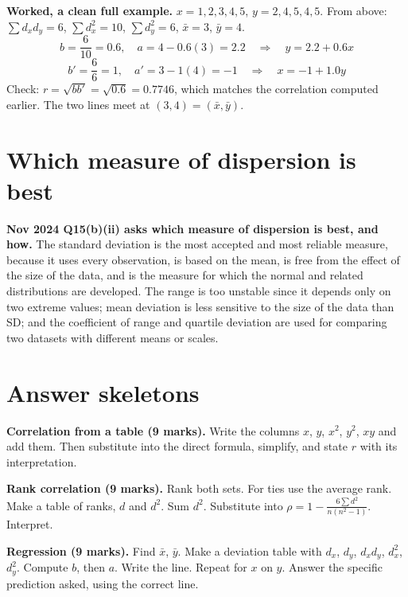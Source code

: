 \documentclass[11pt,a4paper]{article}
\begin{document}
\begin{exambox}
\textbf{Worked, a clean full example.} $x=1,2,3,4,5$, $y=2,4,5,4,5$. From above: $\sum d_xd_y=6$, $\sum d_x^2=10$, $\sum d_y^2=6$, $\bar x=3$, $\bar y=4$.
\[
b=\frac6{10}=0.6,\quad a=4-0.6(3)=2.2 \quad\Rightarrow\quad y=2.2+0.6x
\]
\[
b'=\frac6{6}=1,\quad a'=3-1(4)=-1 \quad\Rightarrow\quad x=-1+1.0y
\]
Check: $r=\sqrt{bb'}=\sqrt{0.6}=0.7746$, which matches the correlation computed earlier. The two lines meet at $(3,4)=(\bar x,\bar y)$.
\end{exambox}

\section{Which measure of dispersion is best}

\begin{exambox}
\textbf{Nov 2024 Q15(b)(ii) asks which measure of dispersion is best, and how.} The standard deviation is the most accepted and most reliable measure, because it uses every observation, is based on the mean, is free from the effect of the size of the data, and is the measure for which the normal and related distributions are developed. The range is too unstable since it depends only on two extreme values; mean deviation is less sensitive to the size of the data than SD; and the coefficient of range and quartile deviation are used for comparing two datasets with different means or scales.
\end{exambox}

\section{Answer skeletons}

\begin{answerbox}
\textbf{Correlation from a table (9 marks).} Write the columns $x$, $y$, $x^2$, $y^2$, $xy$ and add them. Then substitute into the direct formula, simplify, and state $r$ with its interpretation.
\end{answerbox}

\begin{answerbox}
\textbf{Rank correlation (9 marks).} Rank both sets. For ties use the average rank. Make a table of ranks, $d$ and $d^2$. Sum $d^2$. Substitute into $\rho=1-\frac{6\sum d^2}{n(n^2-1)}$. Interpret.
\end{answerbox}

\begin{answerbox}
\textbf{Regression (9 marks).} Find $\bar x$, $\bar y$. Make a deviation table with $d_x$, $d_y$, $d_xd_y$, $d_x^2$, $d_y^2$. Compute $b$, then $a$. Write the line. Repeat for $x$ on $y$. Answer the specific prediction asked, using the correct line.
\end{answerbox}
\end{document}
